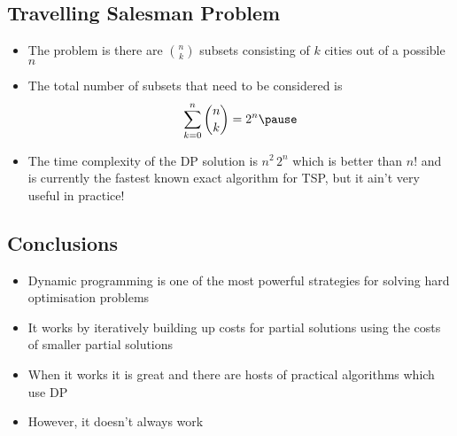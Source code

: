 \begin{slide}
\section{Travelling Salesman Problem}

\begin{PauseHighLight}
  \begin{itemize}
  \item The problem is there are $\binom{n}{k}$ subsets consisting of
    $k$ cities out of a possible $n$\pause
  \item The total number of subsets that need to be considered is
    \begin{align*}
      \sum_{k=0}^n \binom{n}{k} = 2^n\pause
    \end{align*}
  \item The time complexity of the DP solution is $n^2\,2^n$ which is
    better than $n!$ and is currently the fastest known exact algorithm for
    TSP\pause, but it ain't very useful in practice!\pauseb
  \end{itemize}
\end{PauseHighLight}


\end{slide}




\begin{slide}
\section{Conclusions}

\begin{PauseHighLight}
  \begin{itemize}
  \item Dynamic programming is one of the most powerful strategies for
    solving hard optimisation problems\pause
  \item It works by iteratively building up costs for partial solutions
    using the costs of smaller partial solutions\pause
  \item When it works it is great and there are hosts of practical
    algorithms which use DP\pause
  \item However, it doesn't always work\pause
  \end{itemize}
\end{PauseHighLight}

\end{slide}
